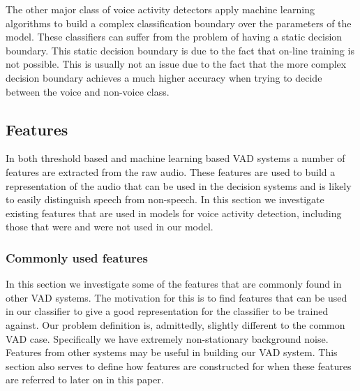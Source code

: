 \documentclass[ %
                    author={Sam Phippen},
                supervisor={Dr. Rafal Bogacz},
                     title={Real time voice activity detectors in noisy personal computing environments},
                  subtitle={},
                    degree={MEng},
                      year={2012} ]{thesis}
\begin{document}
The other major class of voice activity detectors apply machine learning
algorithms to build a complex classification boundary over the parameters of
the model\cite{shin}. These classifiers can suffer from the problem of having a
static decision boundary. This static decision boundary is due to the fact that
on-line training is not possible. This is usually not an issue due to the fact
that the more complex decision boundary achieves a much higher accuracy when
trying to decide between the voice and non-voice class.

\subsection {Features}

In both threshold based and machine learning based VAD systems a number of
features are extracted from the raw audio. These features are used to build a
representation of the audio that can be used in the decision systems and is
likely to easily distinguish speech from non-speech. In this section we
investigate existing features that are used in models for voice activity
detection, including those that were and were not used in our model.

\subsubsection{Commonly used features}

In this section we investigate some of the features that are commonly found in
other VAD systems. The motivation for this is to find features that can be used
in our classifier to give a good representation for the classifier to be
trained against. Our problem definition is, admittedly, slightly different to
the common VAD case. Specifically we have extremely non-stationary background
noise. Features from other systems may be useful in building our VAD system.
This section also serves to define how features are constructed for when these
features are referred to later on in this paper.
\end{document}
